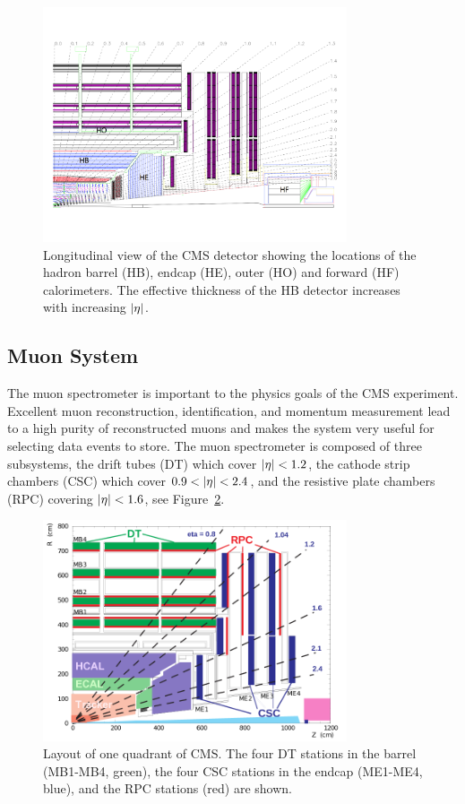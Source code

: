 \begin{figure}[htbp]
\centering
     \includegraphics[width=0.8\textwidth]{cms_and_lhc/plots/cms_hcal.pdf}
     \caption{
Longitudinal view of the CMS detector showing the locations of the hadron 
barrel (HB), endcap (HE), outer (HO) and forward (HF) calorimeters. The
effective thickness of the HB detector increases with increasing $\lvert\eta\rvert$.
     }
     \label{fig:cms_hcal}
\end{figure}




\subsection{Muon System}
The muon spectrometer
is important to the physics goals of the CMS experiment. Excellent muon reconstruction, 
identification, and momentum measurement lead to a high purity of reconstructed
muons and makes the system very useful for selecting data events to store.
The muon spectrometer is composed of three subsystems, the drift tubes (DT) which cover
$\lvert\eta\rvert < 1.2$, the cathode strip chambers (CSC) which cover $0.9 < \lvert\eta\rvert < 2.4$, and
the resistive plate chambers (RPC) covering $\lvert\eta\rvert < 1.6$, see Figure~\ref{fig:cms_muon_syst}.

\begin{figure}[htbp]
\centering
     \includegraphics[width=0.8\textwidth]{cms_and_lhc/plots/cms_muon_syst.png}
     \caption{
Layout of one quadrant of CMS. The four DT stations in the barrel (MB1-MB4, green), the four CSC stations in the endcap (ME1-ME4, blue), and the RPC stations (red) are shown.
     }
     \label{fig:cms_muon_syst}
\end{figure}


